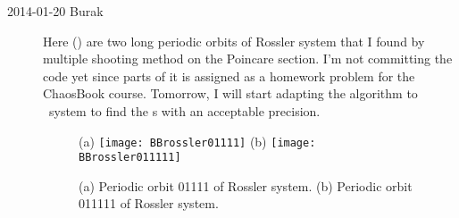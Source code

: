 \begin{description}
\item[2014-01-20 Burak] Here () are two long periodic
orbits of Rossler system that I found by multiple shooting method on the Poincare
section. I'm not committing the code yet since parts of it is assigned as a
homework problem for the ChaosBook course. Tomorrow, I will start adapting
the algorithm to \twoMode\ system to find the \rpo s with an acceptable
precision.

\begin{figure}%
\centering
 (a) \texttt{[image: BBrossler01111]}
 (b) \texttt{[image: BBrossler011111]}
\caption{(a) Periodic orbit 01111 of Rossler system. (b) Periodic orbit 011111 of Rossler system.}
\label{fig:BBrosslerPO}
\end{figure}


\end{description}
